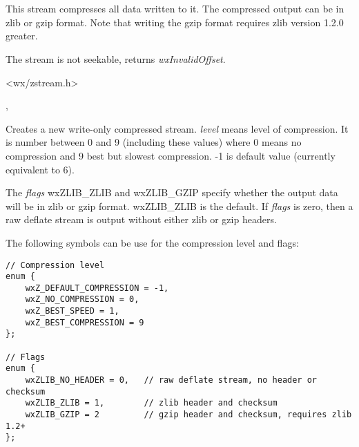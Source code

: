 \section{}\label{wxzliboutputstream}

This stream compresses all data written to it. The compressed output can be
in zlib or gzip format.
Note that writing the gzip format requires zlib version 1.2.0 greater.

The stream is not seekable,  returns
 {\it wxInvalidOffset}.




<wx/zstream.h>


,





Creates a new write-only compressed stream. {\it level} means level of 
compression. It is number between 0 and 9 (including these values) where
0 means no compression and 9 best but slowest compression. -1 is default
value (currently equivalent to 6).

The {\it flags} wxZLIB\_ZLIB and wxZLIB\_GZIP specify whether the output data
will be in zlib or gzip format. wxZLIB\_ZLIB is the default.
If {\it flags} is zero, then a raw deflate stream is output without either
zlib or gzip headers.

The following symbols can be use for the compression level and flags:

\begin{verbatim}
// Compression level
enum {
    wxZ_DEFAULT_COMPRESSION = -1,
    wxZ_NO_COMPRESSION = 0,
    wxZ_BEST_SPEED = 1,
    wxZ_BEST_COMPRESSION = 9
};

// Flags
enum {
    wxZLIB_NO_HEADER = 0,   // raw deflate stream, no header or checksum
    wxZLIB_ZLIB = 1,        // zlib header and checksum
    wxZLIB_GZIP = 2         // gzip header and checksum, requires zlib 1.2+
};
\end{verbatim}

